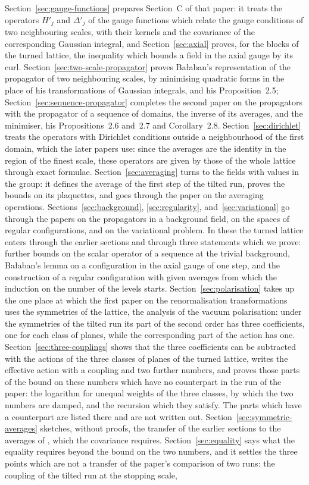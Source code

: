 \documentclass[11pt]{preprint}
\numberwithin{equation}{section}
\theoremstyle{definition}
\theoremstyle{remark}
\theoremstyle{plain}
\begin{document}
Section~\ref{sec:gauge-functions} prepares Section~C of that paper: it treats the operators $H'_j$ and $\Delta'_j$ of the gauge functions which relate the gauge conditions of two neighbouring scales, with their kernels and the covariance of the corresponding Gaussian integral, and Section~\ref{sec:axial} proves, for the blocks of the turned lattice, the inequality which bounds a field in the axial gauge by its curl. Section~\ref{sec:two-scale-propagator} proves Ba{\l}aban's representation of the propagator of two neighbouring scales, by minimising quadratic forms in the place of his transformations of Gaussian integrals, and his Proposition~2.5; Section~\ref{sec:sequence-propagator} completes the second paper on the propagators with the propagator of a sequence of domains, the inverse of its averages, and the minimiser, his Propositions~2.6 and~2.7 and Corollary~2.8. Section~\ref{sec:dirichlet} treats the operators with Dirichlet conditions outside a neighbourhood of the first domain, which the later papers use: since the averages are the identity in the region of the finest scale, these operators are given by those of the whole lattice through exact formulae. Section~\ref{sec:averaging} turns to the fields with values in the group: it defines the average of the first step of the tilted run, proves the bounds on its plaquettes, and goes through the paper on the averaging operations. Sections~\ref{sec:background}, \ref{sec:regularity}, and~\ref{sec:variational} go through the papers on the propagators in a background field, on the spaces of regular configurations, and on the variational problem. In these the turned lattice enters through the earlier sections and through three statements which we prove: further bounds on the scalar operator of a sequence at the trivial background, Ba{\l}aban's lemma on a configuration in the axial gauge of one step, and the construction of a regular configuration with given averages from which the induction on the number of the levels starts. Section~\ref{sec:polarisation} takes up the one place at which the first paper on the renormalisation transformations uses the symmetries of the lattice, the analysis of the vacuum polarisation: under the symmetries of the tilted run its part of the second order has three coefficients, one for each class of planes, while the corresponding part of the action has one. Section~\ref{sec:three-couplings} shows that the three coefficients can be subtracted with the actions of the three classes of planes of the turned lattice, writes the effective action with a coupling and two further numbers, and proves those parts of the bound on these numbers which have no counterpart in the run of the paper: the logarithm for unequal weights of the three classes, by which the two numbers are damped, and the recursion which they satisfy. The parts which have a counterpart are listed there and are not written out. Section~\ref{sec:symmetric-averages} sketches, without proofs, the transfer of the earlier sections to the averages of \cite{BalabanRG1}, which the covariance requires. Section~\ref{sec:equality} says what the equality requires beyond the bound on the two numbers, and it settles the three points which are not a transfer of the paper's comparison of two runs: the coupling of the tilted run at the stopping scale, 
\end{document}
